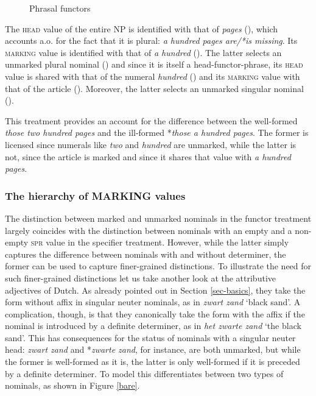 \documentclass[output=paper
                ,modfonts
                ,nonflat
	        ,collection
	        ,collectionchapter
	        ,collectiontoclongg
 	        ,biblatex
                ,babelshorthands
                ,newtxmath
                ,draftmode
                ,colorlinks, citecolor=brown
]{./langsci/langscibook}
\begin{document}
\begin{figure}
\centering
{}
\caption{\label{glorie} Phrasal functors }
\end{figure}

The \textsc{head} value of the entire NP is identified with that 
of \emph{pages} (), which accounts a.o. for the fact that it is plural:
\emph{a hundred pages are/*is missing}. 
Its \textsc{marking} value is identified with that of \emph{a hundred} 
(). The latter selects an unmarked plural nominal () and 
since it is itself a head-functor-phrase, its \textsc{head} value is shared with 
that of the numeral \emph{hundred} () and its \textsc{marking} value 
with that of the article (). Moreover, the latter selects an unmarked 
singular nominal ().
 
This treatment provides an account for the difference between 
the well-formed \emph{those two hundred pages} and the 
ill-formed *\emph{those a hundred pages}. The former is licensed since numerals 
like \emph{two} and \emph{hundred} are unmarked, while the latter is not, since 
the article is marked and since it shares that value with \emph{a hundred pages}.  


\subsubsection{The hierarchy of MARKING values} 
\label{sec-without-spec}


The distinction between marked and unmarked nominals in the functor treatment 
largely coincides with the distinction between nominals with an empty and a 
non-empty \textsc{spr} value in the specifier treatment. However, while  
the latter simply captures the difference between nominals with and without 
determiner, the former can be used to capture finer-grained distinctions.  
To illustrate the need for such finer-grained distinctions 
let us take another look at the attributive adjectives of Dutch. 
As already pointed out in Section \ref{sec-basics}, they take the form without affix in  
singular neuter nominals, as in \emph{zwart zand} `black sand'. A complication, 
though, is that they canonically take the form with the affix if the nominal is  
introduced by a definite determiner, as in \emph{het zwarte zand} `the black sand'. 
This has consequences for the status of nominals with a singular neuter head: 
\emph{zwart zand} and *\emph{zwarte zand}, for instance, are both unmarked, 
but while the former is well-formed as it is, the latter is only 
well-formed if it is preceded by a definite determiner. 
To model this \citet{VanEynde06} differentiates between two types 
of  nominals, as shown in Figure \ref{bare}. 
\end{document}
